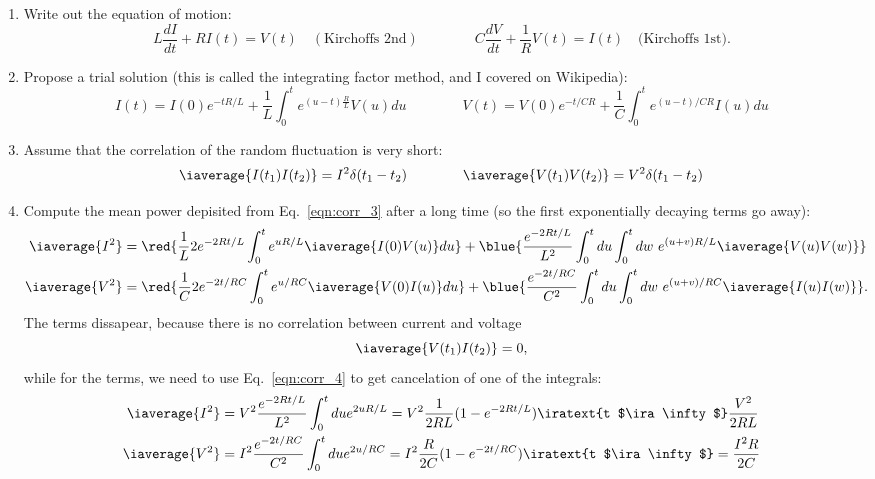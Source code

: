  \begin{enumerate}
 \item Write out the equation of motion:
   \begin{equation}\label{eqn:corr_2}
     L\frac{dI}{dt} + RI(t) = V(t) \quad (\text{Kirchoffs 2nd})\qquad\qquad C\frac{dV}{dt} + \frac{1}{R}V(t) = I(t) \quad \text{(Kirchoffs 1st)}.
   \end{equation}
 \item Propose a trial solution  (this is called the integrating factor
   method, and I covered on Wikipedia):
   \begin{equation}\label{eqn:corr_3}
     I(t) = I(0)e^{-tR/L} + \frac{1}{L}\int_0^t e^{({u-t})\frac{R}{L}}V(u)du\qquad\qquad V(t) = V(0)e^{-t/CR} + \frac{1}{C}\int_0^t e^{({u-t})/{CR}{}}I(u)du
   \end{equation}
 \item Assume  that the correlation  of the random fluctuation  is very
   short:
   \begin{equation}\label{eqn:corr_4}
     \iaverage{I(t_1)I(t_2)} = I^2\delta(t_1-t_2)\qquad\qquad \iaverage{V(t_1)V(t_2)} = V^2\delta(t_1-t_2)
   \end{equation}
 \item  Compute the  mean power  depisited from  Eq.~\eqref{eqn:corr_3}
   after  a long  time (so  the first  exponentially decaying  terms go
   away):
   \begin{equation}
     \begin{aligned}
       \iaverage{I^2} & =\red{ \frac{1}{L}2e^{-2Rt/L}\int_0^{t}e^{uR/L} \iaverage{I(0)V(u)}du} + \blue{\frac{e^{-2Rt/L}}{L^2}\int_0^tdu\int_0^tdw\ e^{(u+v)R/L}\iaverage{V(u)V(w)}}\\
       \iaverage{V^2} & =\red{ \frac{1}{C}2e^{-2t/RC}\int_0^{t}e^{u/RC} \iaverage{V(0)I(u)}du} + \blue{\frac{e^{-2t/RC}}{C^2}\int_0^tdu\int_0^tdw\ e^{(u+v)/RC}\iaverage{I(u)I(w)}}.\\
     \end{aligned}
   \end{equation}
   \noindent  The    terms  dissapear,  because  there  is  no
   correlation between current and voltage
   \[
     \iaverage{V(t_1)I(t_2)} = 0,
   \]
   \noindent  while  for   the    terms,  we   need  to  use
   Eq.~\eqref{eqn:corr_4} to get cancelation of one of the integrals:
   \begin{equation}\label{eqn:corr_5}
     \begin{aligned}
       \iaverage{I^2}& = {V^2\frac{e^{-2Rt/L}}{L^2}\int_0^tdu e^{2uR/L}} = V^2\frac{1}{2RL}(1-e^{-2Rt/L}) \iratext{t $\ira \infty$} \frac{V^2}{2RL}\\
       \iaverage{V^2} & = {I^2\frac{e^{-2t/RC}}{C^2}\int_0^tdu e^{2u/RC}} = I^2\frac{R}{2C}(1-e^{-2t/RC})\iratext{t $\ira \infty$} = \frac{I^2R}{2C}\\
     \end{aligned}
   \end{equation}


\end{enumerate}

